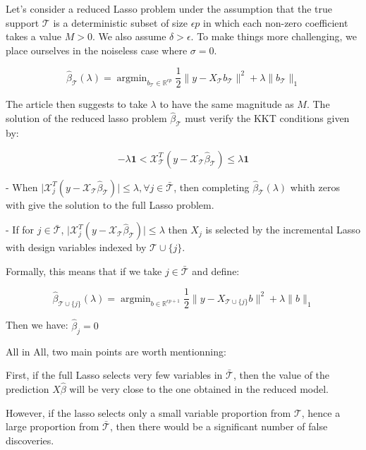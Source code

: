 \documentclass[10pt,onecolumn,letterpaper]{article}
\DeclareMathOperator*{\argmin}{argmin}
\begin{document}
Let's consider a reduced Lasso problem under the assumption that the true support $\mathcal{T}$ is a deterministic subset of size $\epsilon p$ in which each non-zero coefficient takes a value $M > 0$. We also assume $\delta > \epsilon$. To make things more challenging, we place ourselves in the noiseless case where $\sigma = 0$. 

$$
\hat{\beta}_{\mathcal{T}}(\lambda) = \argmin_{b_{\mathcal{T}} \in \mathbb{R}^{\epsilon p}}  \frac{1}{2}\lVert y - X_{\mathcal{T}}b_{\mathcal{T}} \rVert^2 + \lambda \lVert b_{\mathcal{T}} \rVert_1 
$$

The article then suggests to take $\lambda$ to have the same magnitude as $M$. The solution of the reduced lasso problem $\hat{\beta}_{\mathcal{T}}$ must verify the KKT conditions given by: 

$$
- \lambda \boldsymbol{1} < \mathcal{X}_{\mathcal{T}}^T(y - \mathcal{X}_{\mathcal{T}} \hat{\beta}_{\mathcal{T}}) \leq \lambda \boldsymbol{1}
$$

- When $\vert \mathcal{X}_{j}^T(y - \mathcal{X}_{\mathcal{T}} \hat{\beta}_{\mathcal{T}}) \vert \leq \lambda, \forall j \in \bar{\mathcal{T}} $, then completing $\hat{\beta}_{\mathcal{T}}(\lambda)$ whith zeros with give the solution to the full Lasso problem. 
\newline 

- If for $ j \in \bar{\mathcal{T}}$, $\vert \mathcal{X}_{j}^T(y - \mathcal{X}_{\mathcal{T}} \hat{\beta}_{\mathcal{T}}) \vert \leq \lambda $ then $X_j$ is selected by the incremental Lasso with design variables indexed by $\mathcal{T} \cup \{j\}$. 

Formally, this means that if we take $j \in \bar{\mathcal{T}}$ and define:

$$
\hat{\beta}_{\mathcal{T} \cup \{j\}}(\lambda) = \argmin_{b \in \mathbb{R}^{\epsilon p + 1}}  \frac{1}{2}\lVert y - X_{\mathcal{T} \cup \{j\}}b \rVert^2 + \lambda \lVert b \rVert_1 
$$

Then we have: $\hat{\beta}_j = 0$
\newline

All in All, two main points are worth mentionning:
\newline

First, if the full Lasso selects very few variables in $\bar{\mathcal{T}}$, then the value of the prediction $X\hat{\beta}$ will be very close to the one obtained in the reduced model.  

However, if the lasso selects only a small variable proportion from $\mathcal{T}$, hence a large proportion from $\bar{\mathcal{T}}$, then there would be a significant number of false discoveries. 
\end{document}
